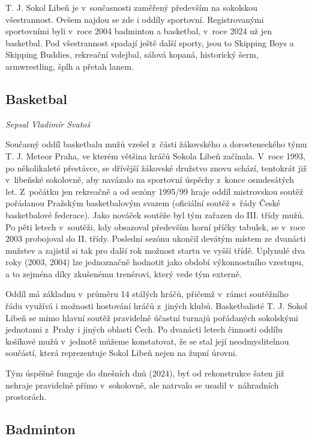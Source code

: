 \documentclass[a5paper, 11pt, twoside]{article}
\begin{document}
T. J. Sokol Libeň je v~současnosti zaměřený především na sokolskou
všestrannost. Ovšem najdou se zde i oddíly sportovní. Registrovanými
sportovními byli v~roce 2004 badminton a basketbal, v~roce 2024 už jen
basketbal. Pod všestrannost spadají ještě další sporty, jsou to Skipping
Boys a Skipping Buddies, rekreační volejbal, sálová kopaná, historický
šerm, armwrestling, šplh a přetah lanem.

\subsection{Basketbal}

\begin{center}
  \textit{Sepsal Vladimír Svatoš}
\end{center}

Současný oddíl basketbalu mužů vzešel z~části žákovského a
dorosteneckého týmu T. J. Meteor Praha, ve kterém většina hráčů Sokola
Libeň začínala. V~roce 1993, po několikaleté přestávce, se dřívější
žákovské družstvo znovu schází, tentokrát již v~libeňské sokolovně, aby
navázalo na sportovní úspěchy z~konce osmdesátých let. Z~počátku jen
rekreačně a od sezóny 1995/99 hraje oddíl mistrovskou soutěž pořádanou
Pražským basketbalovým svazem (oficiální soutěž s~řády České
basketbalové federace). Jako nováček soutěže byl tým zařazen do III.
třídy mužů. Po pěti letech v~soutěži, kdy obsazoval především horní
příčky tabulek, se v~roce 2003 probojoval do II. třídy. Poslední sezónu
ukončil devátým místem ze dvanácti mužstev a zajistil si tak pro další
rok možnost startu ve vyšší třídě. Uplynulé dva roky (2003, 2004) lze
jednoznačně hodnotit jako období výkonnostního vzestupu, a to zejména
díky zkušenému trenérovi, který vede tým externě.

Oddíl má základnu v~průměru 14 stálých hráčů, přičemž v~rámci soutěžního
řádu využívá i možnosti hostování hráčů z~jiných klubů. Basketbalisté T.
J. Sokol Libeň se mimo hlavní soutěž pravidelně účastní turnajů
pořádaných sokolskými jednotami z~Prahy i jiných oblastí Čech. Po
dvanácti letech činnosti oddílu košíkové mužů v~jednotě můžeme
konstatovat, že se stal její neodmyslitelnou součástí, která
reprezentuje Sokol Libeň nejen na župní úrovni.

Tým úspěšně funguje do dnešních dnů (2024), byť od rekonstrukce šaten
již nehraje pravidelně přímo v~sokolovně, ale natrvalo se usadil
v~náhradních prostorách.

\subsection{Badminton}
\end{document}
